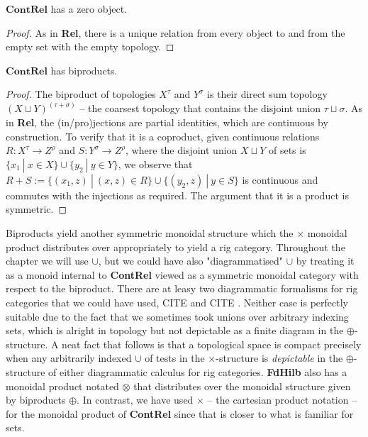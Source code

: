 \begin{marginfigure}
\begin{proposition}
$\mathbf{ContRel}$ has a zero object.
\begin{proof}
As in \textbf{Rel}, there is a unique relation from every object to and from the empty set with the empty topology.
\end{proof}
\end{proposition}

\begin{proposition}
$\mathbf{ContRel}$ has biproducts.
\begin{proof}
The biproduct of topologies $X^\tau$ and $Y^\sigma$ is their direct sum topology $(X \sqcup Y)^{(\tau + \sigma)}$ -- the coarsest topology that contains the disjoint union $\tau \sqcup \sigma$. As in \textbf{Rel}, the (in/pro)jections are partial identities, which are continuous by construction. To verify that it is a coproduct, given continuous relations $R: X^\tau \rightarrow Z^\rho$ and $S: Y^\sigma \rightarrow Z^\rho$, where the disjoint union $X \sqcup Y$ of sets is $\{x_1 \ | \ x \in X\} \cup \{y_2 \ | \ y \in Y\}$, we observe that $R + S := \{ (x_1,z) \ | \ (x,z) \in R \} \cup \{ (y_2,z) \ | \ y \in S \}$ is continuous and commutes with the injections as required. The argument that it is a product is symmetric.
\end{proof}
\end{proposition}

\begin{remark}
Biproducts yield another symmetric monoidal structure which the $\times$ monoidal product distributes over appropriately to yield a rig category. Throughout the chapter we will use $\cup$, but we could have also "diagrammatised" $\cup$ by treating it as a monoid internal to \textbf{ContRel} viewed as a symmetric monoidal category with respect to the biproduct. There are at leasy two diagrammatic formalisms for rig categories that we could have used, \bR CITE \e and \bR CITE \e. Neither case is perfectly suitable due to the fact that we sometimes took unions over arbitrary indexing sets, which is alright in topology but not depictable as a finite diagram in the $\oplus$-structure. A neat fact that follows is that a topological space is compact precisely when any arbitrarily indexed $\cup$ of tests in the $\times$-structure is \emph{depictable} in the $\oplus$-structure of either diagrammatic calculus for rig categories. \textbf{FdHilb} also has a monoidal product notated $\otimes$ that distributes over the monoidal structure given by biproducts $\oplus$. In contrast, we have used $\times$ -- the cartesian product notation -- for the monoidal product of \textbf{ContRel} since that is closer to what is familiar for sets.
\end{remark}


\end{marginfigure}
